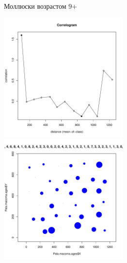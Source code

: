	\begin{figure}[h]

	\begin{minipage}[b]{\linewidth}
	\begin{center}
		Моллюски возрастом 9+
	\end{center}
	\end{minipage}
	
	\begin{minipage}[b]{.46\linewidth}
	\begin{center}
		\includegraphics[width=65mm]{../Barenc_Sea/distribution_Moran/Pala_macoma_age_N9_.pdf}
	\end{center}
	\end{minipage}
	\hfil %
	\begin{minipage}[b]{.46\linewidth}
	\begin{center}
		\includegraphics[width=65mm]{../Barenc_Sea/distribution_Moran/Pala_macoma_age_bubb_N9_.pdf}
	\end{center}
	\end{minipage}


\end{figure}
